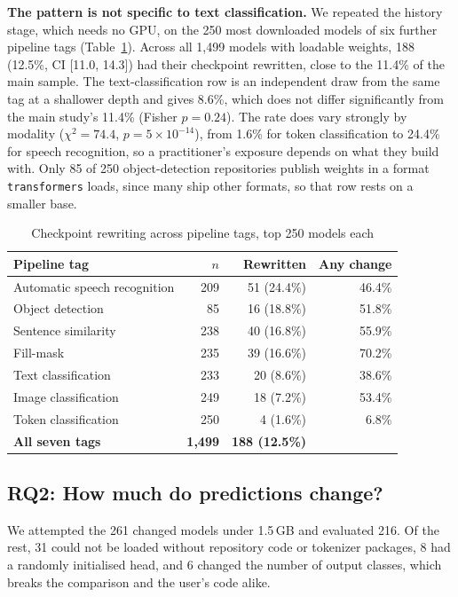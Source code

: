 \documentclass[conference]{IEEEtran}
\newcommand{\code}[1]{\texttt{#1}}
\begin{document}
\textbf{The pattern is not specific to text classification.} We repeated the history stage, which needs no GPU, on the 250 most downloaded models of six further pipeline tags (Table~\ref{tab:tags}). Across all 1,499 models with loadable weights, 188 (12.5\%, CI [11.0, 14.3]) had their checkpoint rewritten, close to the 11.4\% of the main sample. The text-classification row is an independent draw from the same tag at a shallower depth and gives 8.6\%, which does not differ significantly from the main study's 11.4\% (Fisher $p = 0.24$). The rate does vary strongly by modality ($\chi^2 = 74.4$, $p = 5\times10^{-14}$), from 1.6\% for token classification to 24.4\% for speech recognition, so a practitioner's exposure depends on what they build with. Only 85 of 250 object-detection repositories publish weights in a format \code{transformers} loads, since many ship other formats, so that row rests on a smaller base.

\begin{table}[t]
\caption{Checkpoint rewriting across pipeline tags, top 250 models each}
\label{tab:tags}
\centering
\footnotesize
\begin{tabular}{lrrr}
\toprule
Pipeline tag & $n$ & Rewritten & Any change \\
\midrule
Automatic speech recognition & 209 & 51 (24.4\%) & 46.4\% \\
Object detection & 85 & 16 (18.8\%) & 51.8\% \\
Sentence similarity & 238 & 40 (16.8\%) & 55.9\% \\
Fill-mask & 235 & 39 (16.6\%) & 70.2\% \\
Text classification & 233 & 20 (8.6\%) & 38.6\% \\
Image classification & 249 & 18 (7.2\%) & 53.4\% \\
Token classification & 250 & 4 (1.6\%) & 6.8\% \\
\midrule
\textbf{All seven tags} & \textbf{1,499} & \textbf{188 (12.5\%)} & \\
\bottomrule
\end{tabular}
\end{table}

\subsection{RQ2: How much do predictions change?}\label{sec:rq2}
We attempted the 261 changed models under 1.5\,GB and evaluated 216. Of the rest, 31 could not be loaded without repository code or tokenizer packages, 8 had a randomly initialised head, and 6 changed the number of output classes, which breaks the comparison and the user's code alike.
\end{document}

